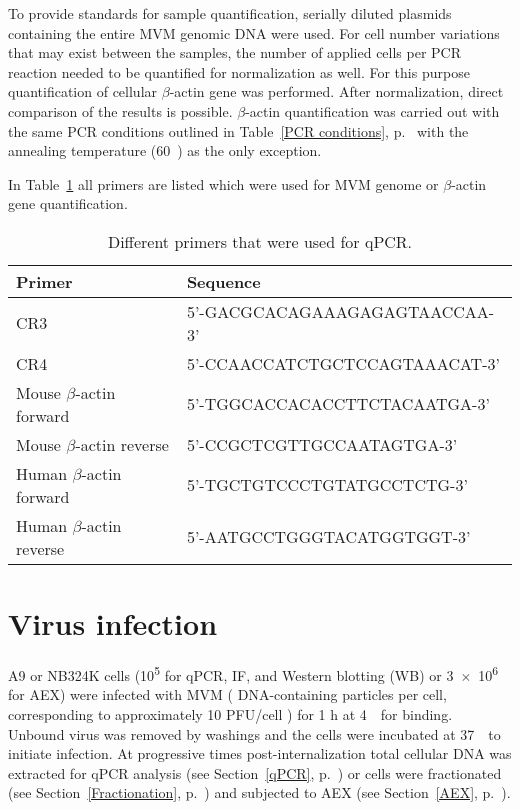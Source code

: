 To provide standards for sample quantification, serially diluted plasmids containing the entire MVM genomic DNA were used.
For cell number variations that may exist between the samples, the number of applied cells per PCR reaction needed to be quantified for normalization as well. For this purpose quantification of cellular $\beta$-actin gene was performed. After normalization, direct comparison of the results is possible. $\beta$-actin quantification was carried out with the same PCR conditions outlined in Table~\ref{PCR conditions}, p.~\pageref{PCR conditions} with the annealing temperature (60~\textcelsius) as the only exception.

In Table~\ref{Primers} all primers are listed which were used for MVM genome or $\beta$-actin gene quantification. 
\begin{table}[H]
\begin{center}
\begin{tabular}{l l}
\textbf{Primer} & \textbf{Sequence}\\
\hline
CR3 & 5'-GACGCACAGAAAGAGAGTAACCAA-3'\\
CR4 & 5'-CCAACCATCTGCTCCAGTAAACAT-3'\\
Mouse $\beta$-actin forward & 5'-TGGCACCACACCTTCTACAATGA-3' \\
Mouse $\beta$-actin reverse & 5'-CCGCTCGTTGCCAATAGTGA-3' \\
Human $\beta$-actin forward & 5'-TGCTGTCCCTGTATGCCTCTG-3' \\
Human $\beta$-actin reverse & 5'-AATGCCTGGGTACATGGTGGT-3' \\
\end{tabular} 
\end{center} 
\caption[Primers]{Different primers that were used for qPCR.}
\label{Primers}
\end{table}


\section{Virus infection} 

A9 or NB324K cells (10\textsuperscript{5} for qPCR, IF, and Western blotting (WB) or 3~$\times$~10\textsuperscript{6} for AEX) were infected with MVM ( DNA-containing particles per cell, corresponding to approximately 10 PFU/cell \cite{pmid4673484}) for 1 h at 4~\textcelsius~for binding. Unbound virus was removed by washings and the cells were incubated at 37~\textcelsius~to initiate infection. At progressive times post-internalization total cellular DNA was extracted for qPCR analysis (see Section~\ref{qPCR}, p.~\pageref{qPCR}) or cells were fractionated (see Section~\ref{Fractionation}, p.~\pageref{Fractionation}) and subjected to AEX (see Section~\ref{AEX}, p.~\pageref{AEX}).    



